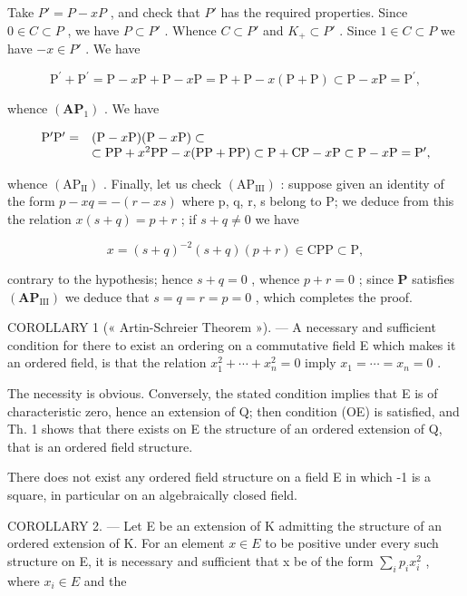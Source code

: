 Take \(P' = P - xP\) , and check that \(P'\) has the required properties. Since \(0 \in C \subset P\) , we have \(P \subset P'\) . Whence \(C \subset P'\) and \(K_{+} \subset P'\) . Since \(1 \in C \subset P\) we have \(-x \in P'\) . We have

\[
\mathrm{P} ^ {\prime} + \mathrm{P} ^ {\prime} = \mathrm{P} - x \mathrm{P} + \mathrm{P} - x \mathrm{P} = \mathrm{P} + \mathrm{P} - x (\mathrm{P} + \mathrm{P}) \subset \mathrm{P} - x \mathrm{P} = \mathrm{P} ^ {\prime},
\]

whence \((\mathbf{AP}_1)\) . We have

\[
\begin{array}{r l} \mathrm {P^ {\prime} P^ {\prime}} = & (\mathrm{P} - x \mathrm{P}) (\mathrm{P} - x \mathrm{P}) \subset \\ & \subset \mathrm{PP} + x ^ {2} \mathrm{PP} - x (\mathrm{PP} + \mathrm{PP}) \subset \mathrm{P} + \mathrm{CP} - x \mathrm{P} \subset \mathrm{P} - x \mathrm{P} = \mathrm {P^ {\prime}}, \end{array}
\]

whence \((\mathrm{AP}_{\mathrm{II}})\) . Finally, let us check \((\mathrm{AP}_{\mathrm{III}})\) : suppose given an identity of the form \(p - xq = -(r - xs)\) where p, q, r, s belong to P; we deduce from this the relation \(x(s + q) = p + r\) ; if \(s + q \neq 0\) we have

\[
x = (s + q) ^ {- 2} (s + q) (p + r) \in \mathrm{CPP} \subset \mathrm{P},
\]

contrary to the hypothesis; hence \(s + q = 0\) , whence \(p + r = 0\) ; since \(\mathbf{P}\) satisfies \((\mathbf{AP}_{\mathrm{III}})\) we deduce that \(s = q = r = p = 0\) , which completes the proof.

COROLLARY 1 (« Artin-Schreier Theorem »). --- A necessary and sufficient condition for there to exist an ordering on a commutative field E which makes it an ordered field, is that the relation \(x_{1}^{2} + \cdots + x_{n}^{2} = 0\) imply \(x_{1} = \cdots = x_{n} = 0\) .

The necessity is obvious. Conversely, the stated condition implies that E is of characteristic zero, hence an extension of Q; then condition (OE) is satisfied, and Th. 1 shows that there exists on E the structure of an ordered extension of Q, that is an ordered field structure.

There does not exist any ordered field structure on a field E in which -1 is a square, in particular on an algebraically closed field.

COROLLARY 2. --- Let E be an extension of K admitting the structure of an ordered extension of K. For an element \(x \in E\) to be positive under every such structure on E, it is necessary and sufficient that x be of the form \(\sum_{i} p_{i} x_{i}^{2}\) , where \(x_{i} \in E\) and the

